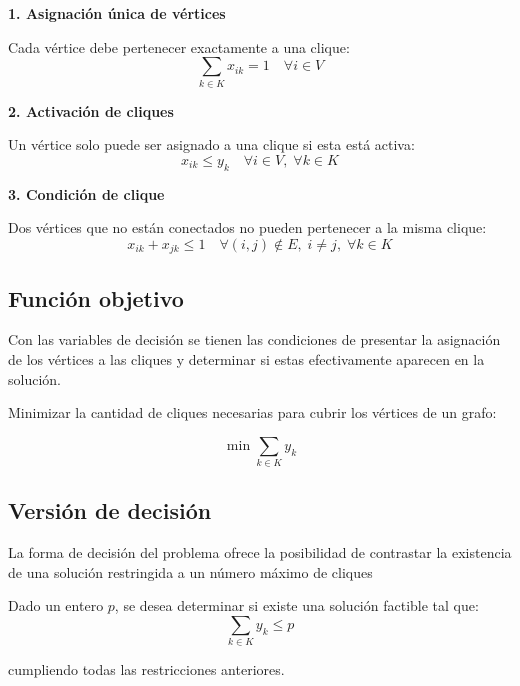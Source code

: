 \textbf{1. Asignación única de vértices}

Cada vértice debe pertenecer exactamente a una clique:
\[
\sum_{k \in K} x_{ik} = 1 \quad \forall i \in V
\]

\textbf{2. Activación de cliques}

Un vértice solo puede ser asignado a una clique si esta está activa:
\[
x_{ik} \leq y_k \quad \forall i \in V, \; \forall k \in K
\]

\textbf{3. Condición de clique}

Dos vértices que no están conectados no pueden pertenecer a la misma clique:
\[
x_{ik} + x_{jk} \leq 1 \quad \forall (i,j) \notin E,\; i \neq j,\; \forall k \in K
\]

\subsection{Función objetivo}

Con las variables de decisión se tienen las condiciones de presentar la asignación de los vértices a las cliques y determinar si estas efectivamente aparecen en la solución. 

\vspace{0.5cm}

Minimizar la cantidad de cliques necesarias para cubrir los vértices de un grafo:

\[
\min \sum_{k \in K} y_k
\]

\subsection{Versión de decisión}

La forma de decisión del problema ofrece la posibilidad de contrastar la existencia de una solución restringida a un número máximo de cliques 

Dado un entero $p$, se desea determinar si existe una solución factible tal que:
\[
\sum_{k \in K} y_k \leq p
\]

cumpliendo todas las restricciones anteriores.